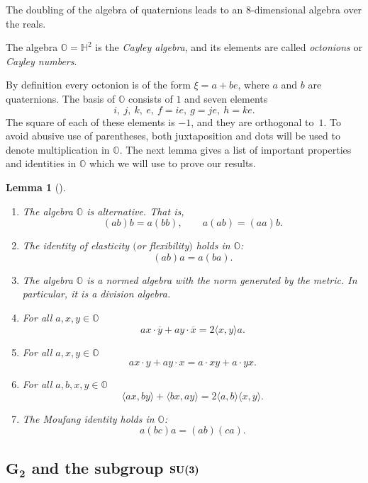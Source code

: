 \documentclass[10pt,a4paper]{amsart}
\numberwithin{equation}{section}
\newtheorem{Lemma}[Theorem]{Lemma}
\newcommand{\SH}{\mathbb{H}} %
\newcommand{\SO}{\mathbb{O}} %
\begin{document}
The doubling of the algebra of quaternions leads to an 8-dimensional algebra over the reals.
\begin{Definition} The algebra $\SO=\SH^2$ is the \textit{Cayley algebra}, and its elements are called \textit{octonions} or \textit{Cayley numbers}.
\end{Definition}
By definition every octonion is of the form $\xi=a+be$, where $a$ and $b$ are quaternions. The basis of $\SO$ consists of $1$ and seven elements
\[i,\ j,\ k,\ e,\ f=ie,\ g=je,\ h=ke .\]
The square of each of these elements is $-1$, and they are orthogonal to~$1$. To avoid abusive use of parentheses, both juxtaposition and dots will be used to denote multiplication in $\SO$. The next lemma gives a list of important properties and identities in $\SO$ which we will use to prove our results.

\begin{Lemma}[{\cite{postnikov1986lie}}]\label{lem:octprop}\quad
 \begin{enumerate}\itemsep=0pt
\item[$1.$] The algebra $\SO$ is alternative. That is,
 \[ (a b ) b=a (b b),\qquad a(a b)=(a a)b. \]
\item[$2.$] %
The identity of elasticity $($or flexibility$)$ holds in $\SO$:
 \[ (ab)a=a(ba). \]
\item[$3.$] The algebra $\SO$ is a normed algebra with the norm generated by the metric. In particular, it is a division algebra.
\item[$4.$] %
For all $a,x,y \in \SO$ \[ax\cdot\overline{y}+ay\cdot\overline{x}=2 \langle x,y \rangle a.\]
\item[$5.$] %
For all $a,x,y \in \SO$ \[ax\cdot y+ay\cdot x=a\cdot xy+a\cdot yx. \]
\item[$6.$] %
For all $a,b,x,y \in \SO$ \[ \langle ax,by\rangle+\langle bx,ay\rangle=2\langle a,b\rangle \langle x,y\rangle. \]
\item[$7.$] %
The Moufang identity holds in $\SO$: \[ a (bc) a= (ab)(ca). \]
 \end{enumerate}
\end{Lemma}

\subsection[$G_2$ and the subgroup ${\rm SU}(3)$]{$\boldsymbol{G_2}$ and the subgroup $\boldsymbol{{\rm SU}(3)}$}\label{section2.2}
\end{document}
